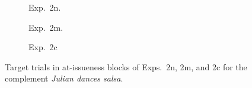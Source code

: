 \documentclass[11pt,fleqn]{article}
\newcommand{\6}{\mbox{$[\hspace*{-.6mm}[$}}
\newcommand{\9}{\mbox{$]\hspace*{-.6mm}]$}}
\begin{document}
\begin{figure}[h!]
\centering

\begin{subfigure}[t]{0.5\textwidth}
        \centering
{}
\caption{Exp.~2n.}\label{fig-exp1q-ai}
\end{subfigure}%
\begin{subfigure}[t]{0.5\textwidth}
\centering
{} 
\caption{Exp.~2m.}\label{fig-exp2q-ai}
 \end{subfigure}
\begin{subfigure}[t]{0.5\textwidth}
        \centering
{}
\caption{Exp.~2c}\label{fig-exp3q-ai}
 \end{subfigure}

\caption{Target trials in at-issueness blocks of Exps.~2n, 2m, and 2c for the complement {\em Julian dances salsa}.}\label{f-ai-trialsq}
\end{figure}
\end{document}
